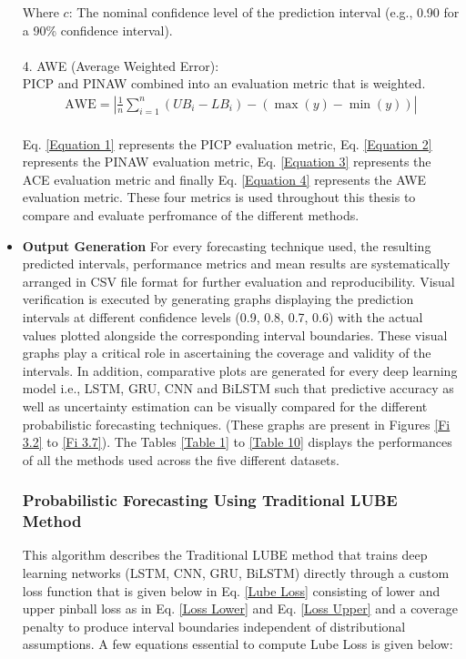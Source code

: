 \begin{itemize}
    Where $c$: The nominal confidence level of the prediction interval (e.g., 0.90 for a 90\% confidence interval).
    \\ \\
    4. AWE (Average Weighted Error):\\
    PICP and PINAW combined into an evaluation metric that is weighted.
    \begin{equation}
    \begin{aligned}
    \text{AWE} = \left| \frac{1}{n} \sum_{i=1}^n (UB_i - LB_i) - (\max(y) - \min(y)) \right|
    \end{aligned}
    \label{Equation 4}
    \end{equation}
    \\

    Eq. \eqref{Equation 1} represents the PICP evaluation metric, Eq. \eqref{Equation 2} represents the PINAW evaluation metric, Eq. \eqref{Equation 3} represents the ACE evaluation metric and finally Eq. \eqref{Equation 4} represents the AWE evaluation metric. These four metrics is used throughout this thesis to compare and evaluate perfromance of the different methods.

    \item \textbf{Output Generation}
    For every forecasting technique used, the resulting predicted intervals, performance metrics and mean results are systematically arranged in CSV file format for further evaluation and reproducibility. Visual verification is executed by generating graphs displaying the prediction intervals at different confidence levels (0.9, 0.8, 0.7, 0.6) with the actual values plotted alongside the corresponding interval boundaries. These visual graphs play a critical role in ascertaining the coverage and validity of the intervals. In addition, comparative plots are generated for every deep learning model i.e., LSTM, GRU, CNN and BiLSTM such that predictive accuracy as well as uncertainty estimation can be visually compared for the different probabilistic forecasting techniques. (These graphs are present in Figures \ref{Fi 3.2} to \ref{Fi 3.7}). The Tables \ref{Table 1} to \ref{Table 10} displays the performances of all the methods used across the five different datasets.

    
    \subsubsection{Probabilistic Forecasting Using Traditional LUBE Method}
        This algorithm describes the Traditional LUBE method that trains deep learning networks (LSTM, CNN, GRU, BiLSTM) directly through a custom loss function that is given below in Eq. \eqref{Lube Loss} consisting of lower and upper pinball loss as in Eq. \eqref{Loss Lower} and Eq. \eqref{Loss Upper} and a coverage penalty to produce interval boundaries independent of distributional assumptions. A few equations essential to compute Lube Loss is given below:\\
        

\end{itemize}
